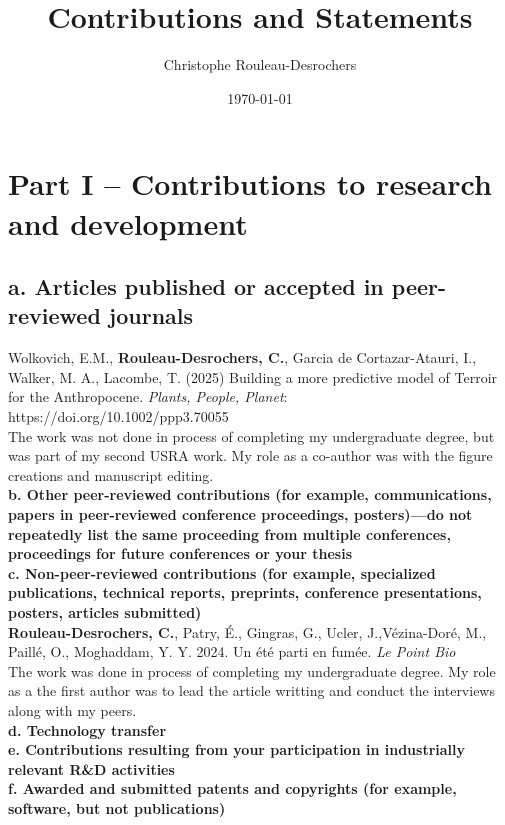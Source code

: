 \documentclass{article}
\title{Contributions and Statements}
\date{\today}
\author{Christophe Rouleau-Desrochers}
\begin{document}

\maketitle

\section*{Part I – Contributions to research and development}
\subsection*{a. Articles published or accepted in peer-reviewed journals} 
Wolkovich, E.M., \textbf{Rouleau-Desrochers, C.}, Garcia de Cortazar-Atauri, I., Walker, M. A., Lacombe,
T. (2025) Building a more predictive model of Terroir for the Anthropocene. \textit{Plants, People, Planet}: https://doi.org/10.1002/ppp3.70055 \\
The work was not done in process of completing my undergraduate degree, but was part of my second USRA work. My role as a co-author was with the figure creations and manuscript editing. \\
\textbf{b. Other peer-reviewed contributions (for example, communications, papers in peer-reviewed conference proceedings, posters)—do not repeatedly list the same proceeding from multiple conferences, proceedings for future conferences or your thesis} \\
\textbf{c. Non-peer-reviewed contributions (for example, specialized publications, technical reports, preprints, conference presentations, posters, articles submitted)} \\
\textbf{Rouleau-Desrochers, C.}, Patry, É., Gingras, G., Ucler, J.,Vézina-Doré, M., Paillé, O., Moghaddam, Y. Y. 2024. Un été parti en fumée. \textit{Le Point Bio} \\
The work was done in process of completing my undergraduate degree. My role as a the first author was to lead the article writting and conduct the interviews along with my peers.\\
\textbf{d. Technology transfer} \\ 
\textbf{e. Contributions resulting from your participation in industrially relevant R\&D activities} \\ 
\textbf{f. Awarded and submitted patents and copyrights (for example, software, but not publications)}
\end{document}
